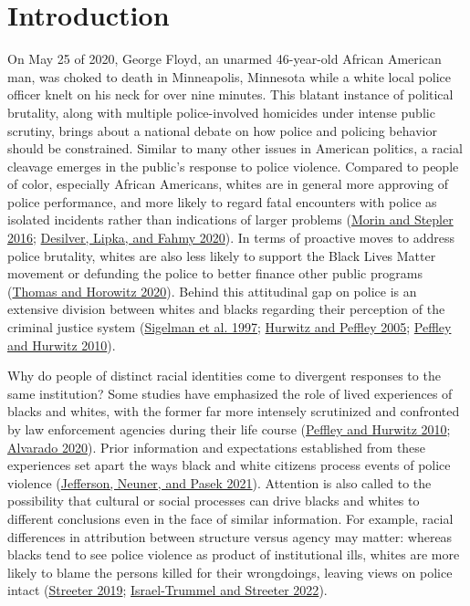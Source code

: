 \documentclass[
  12pt,
]{article}
\begin{document}
\hypertarget{introduction}{%
\section{Introduction}\label{introduction}}

On May 25 of 2020, George Floyd, an unarmed 46-year-old African American
man, was choked to death in Minneapolis, Minnesota while a white local
police officer knelt on his neck for over nine minutes. This blatant
instance of political brutality, along with multiple police-involved
homicides under intense public scrutiny, brings about a national debate
on how police and policing behavior should be constrained. Similar to
many other issues in American politics, a racial cleavage emerges in the
public's response to police violence. Compared to people of color,
especially African Americans, whites are in general more approving of
police performance, and more likely to regard fatal encounters with
police as isolated incidents rather than indications of larger problems
(\protect\hyperlink{ref-morin2016}{Morin and Stepler 2016};
\protect\hyperlink{ref-desilver}{Desilver, Lipka, and Fahmy 2020}). In
terms of proactive moves to address police brutality, whites are also
less likely to support the Black Lives Matter movement or defunding the
police to better finance other public programs
(\protect\hyperlink{ref-thomas}{Thomas and Horowitz 2020}). Behind this
attitudinal gap on police is an extensive division between whites and
blacks regarding their perception of the criminal justice system
(\protect\hyperlink{ref-sigelman1997}{Sigelman et al. 1997};
\protect\hyperlink{ref-hurwitz2005}{Hurwitz and Peffley 2005};
\protect\hyperlink{ref-peffley2010}{Peffley and Hurwitz 2010}).

Why do people of distinct racial identities come to divergent responses
to the same institution? Some studies have emphasized the role of lived
experiences of blacks and whites, with the former far more intensely
scrutinized and confronted by law enforcement agencies during their life
course (\protect\hyperlink{ref-peffley2010}{Peffley and Hurwitz 2010};
\protect\hyperlink{ref-alvarado2020}{Alvarado 2020}). Prior information
and expectations established from these experiences set apart the ways
black and white citizens process events of police violence
(\protect\hyperlink{ref-jefferson2021}{Jefferson, Neuner, and Pasek
2021}). Attention is also called to the possibility that cultural or
social processes can drive blacks and whites to different conclusions
even in the face of similar information. For example, racial differences
in attribution between structure versus agency may matter: whereas
blacks tend to see police violence as product of institutional ills,
whites are more likely to blame the persons killed for their
wrongdoings, leaving views on police intact
(\protect\hyperlink{ref-streeter2019}{Streeter 2019};
\protect\hyperlink{ref-israel-trummel2022}{Israel-Trummel and Streeter
2022}).
\end{document}
